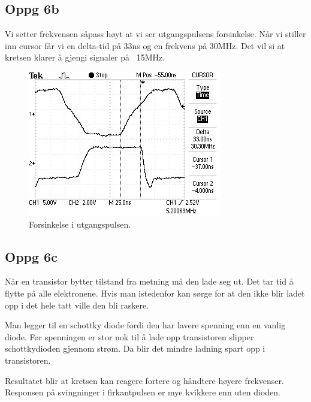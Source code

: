 \subsection{Oppg 6b}
Vi setter frekvensen såpass høyt at vi ser utgangspulsens forsinkelse.
Når vi stiller inn cursor får vi en delta-tid på 33ns og en frekvens på 30MHz.
Det vil si at kretsen klarer å gjengi signaler på ~15MHz.
\begin{figure}[H]
  \caption{Forsinkelse i utgangspulsen.}
  \centering
    \includegraphics[width=\textwidth]{6b.jpg}
\end{figure}



\subsection{Oppg 6c}
Når en transistor bytter tilstand fra metning må den lade seg ut.
Det tar tid å flytte på alle elektronene.
Hvis man istedenfor kan sørge for at den ikke blir ladet opp i det hele tatt ville den bli raskere.

Man legger til en schottky diode fordi den har lavere spenning enn en vanlig diode.
Før spenningen er stor nok til å lade opp transistoren slipper schottkydioden gjennom strøm.
Da blir det mindre ladning spart opp i transistoren.

Resultatet blir at kretsen kan reagere fortere og håndtere høyere frekvenser.
Responsen på svingninger i firkantpulsen er mye kvikkere enn uten dioden.
